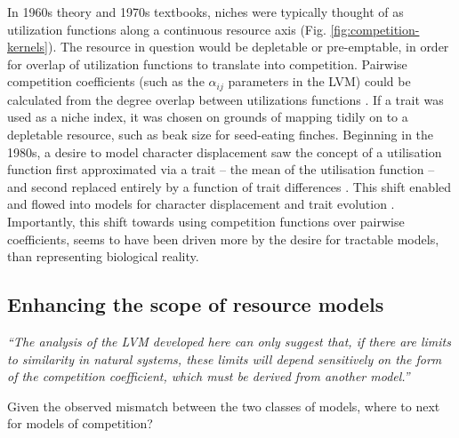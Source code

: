 \documentclass[a4paper,11pt]{article}
\begin{document}
In 1960s theory and 1970s textbooks, niches were typically thought of as utilization functions along a continuous resource axis \citep{MacArthur-1967,Abrams-1975} (Fig. \ref{fig:competition-kernels}). The resource in question would be depletable or pre-emptable, in order for overlap of utilization functions to translate into competition. Pairwise competition coefficients (such as the $\alpha_{ij}$ parameters in the LVM) could be calculated from the degree overlap between utilizations functions \citep{MacArthur-1967, May-1972, Abrams-1975}. If a trait was used as a niche index, it was chosen on grounds of mapping tidily on to a depletable resource, such as beak size for seed-eating finches. Beginning in the 1980s, a desire to model character displacement saw the concept of a utilisation function first approximated via a trait -- the mean of the utilisation function \citep{Roughgarden-1979} -- and second replaced entirely by a function of trait differences \citep{Slatkin-1980,Taper-1985}. This shift enabled and flowed into models for character displacement \citep[e.g.,][]{Taper-1985, Case-2000, Goldberg-2006} and trait evolution \citep{Brown-1987, Geritz-1998, Geritz-1999, Dieckmann-1999, Abrams-2001}. Importantly, this shift towards using competition functions over pairwise coefficients, seems to have been driven more by the desire for tractable models, than representing biological reality.

\subsection{Enhancing the scope of resource models}

\emph{``The analysis of the LVM developed here can only suggest that, if there are limits to similarity in natural systems, these limits will depend sensitively on the form of the competition coefficient, which must be derived from another model.''}\citep{Abrams-1975}

Given the observed mismatch between the two classes of models, where to next for models of competition?
\end{document}
